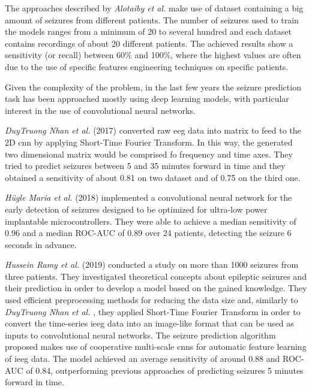 The approaches described by \textit{Alotaiby et al.} \cite{EURASIP:seizuredetpredsurvey} make use of dataset containing a big amount of seizures from different patients. The number of seizures used to train the models ranges from a minimum of 20 to several hundred and each dataset contains recordings of about 20 different patients. The achieved results show a sensitivity (or recall) between 60\% and 100\%, where the highest values are often due to the use of specific features engineering techniques on specific patients.

Given the complexity of the problem, in the last few years the seizure prediction task has been approached mostly using deep learning models, with particular interest in the use of convolutional neural networks.

\textit{DuyTruong Nhan et al.} (2017) \cite{NeuralNetworks:cnnold} converted raw \acs{eeg} data into matrix to feed to the 2D \acs{cnn} by applying Short-Time Fourier Transform. In this way, the generated two dimensional matrix would be comprised fo frequency and time axes. They tried to predict seizures between 5 and 35 minutes forward in time and they obtained a sensitivity of about 0.81 on two dataset and of 0.75 on the third one.

\textit{Hügle Maria et al.} (2018) \cite{arXiv:earlyseizuredetection} implemented a convolutional neural network for the early detection of seizures designed to be optimized for ultra-low power implantable microcontrollers. They were able to achieve a median sensitivity of 0.96 and a median ROC-AUC of 0.89 over 24 patients, detecting the seizure 6 seconds in advance.

\textit{Hussein Ramy et al.} (2019) \cite{arXiv:quantitativeanalysis} conducted a study on more than 1000 seizures from three patients. They investigated theoretical concepts about epileptic seizures and their prediction in order to develop a model based on the gained knowledge. They used efficient preprocessing methods for reducing the data size and, similarly to \textit{DuyTruong Nhan et al.} \cite{NeuralNetworks:cnnold}, they applied Short-Time Fourier Transform in order to convert the time-series \acs{ieeg} data into an image-like format that can be used as inputs to convolutional neural networks. The seizure prediction algorithm proposed makes use of cooperative multi-scale \acsp{cnn} for automatic feature learning of \acs{ieeg} data. The model achieved an average sensitivity of around 0.88 and ROC-AUC of 0.84, outperforming previous approaches of predicting seizures 5 minutes forward in time.

